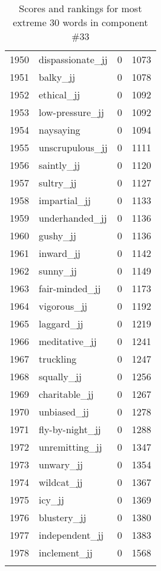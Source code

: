 \begin{longtable}[!htbp]{| rlr@{.}l |}
    1950 & dispassionate\_jj & 0 & 1073 \\
    1951 & balky\_jj & 0 & 1078 \\
    1952 & ethical\_jj & 0 & 1092 \\
    1953 & low-pressure\_jj & 0 & 1092 \\
    1954 & naysaying & 0 & 1094 \\
    1955 & unscrupulous\_jj & 0 & 1111 \\
    1956 & saintly\_jj & 0 & 1120 \\
    1957 & sultry\_jj & 0 & 1127 \\
    1958 & impartial\_jj & 0 & 1133 \\
    1959 & underhanded\_jj & 0 & 1136 \\
    1960 & gushy\_jj & 0 & 1136 \\
    1961 & inward\_jj & 0 & 1142 \\
    1962 & sunny\_jj & 0 & 1149 \\
    1963 & fair-minded\_jj & 0 & 1173 \\
    1964 & vigorous\_jj & 0 & 1192 \\
    1965 & laggard\_jj & 0 & 1219 \\
    1966 & meditative\_jj & 0 & 1241 \\
    1967 & truckling & 0 & 1247 \\
    1968 & squally\_jj & 0 & 1256 \\
    1969 & charitable\_jj & 0 & 1267 \\
    1970 & unbiased\_jj & 0 & 1278 \\
    1971 & fly-by-night\_jj & 0 & 1288 \\
    1972 & unremitting\_jj & 0 & 1347 \\
    1973 & unwary\_jj & 0 & 1354 \\
    1974 & wildcat\_jj & 0 & 1367 \\
    1975 & icy\_jj & 0 & 1369 \\
    1976 & blustery\_jj & 0 & 1380 \\
    1977 & independent\_jj & 0 & 1383 \\
    1978 & inclement\_jj & 0 & 1568 \\
    \hline
    \caption{Scores and rankings for most extreme 30 words in component \#33} \\
\end{longtable}
